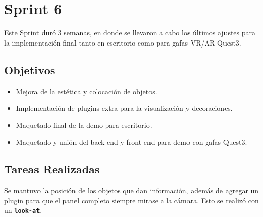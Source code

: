 \documentclass[a4paper, 12pt]{book}
\begin{document}
\clearpage
\section{Sprint 6} 
\label{sec:sprint6}
Este Sprint duró 3 semanas, en donde se llevaron a cabo los últimos ajustes para la implementación final tanto en escritorio como para gafas VR/AR Quest3.
\subsection{Objetivos}
\begin{itemize}
 \item Mejora de la estética y colocación de objetos.
 \item Implementación de plugins extra para la visualización y decoraciones.
 \item Maquetado final de la demo para escritorio.
 \item Maquetado y unión del back-end y front-end para demo con gafas Quest3. 
\end{itemize}
\subsection{Tareas Realizadas}
Se mantuvo la posición de los objetos que dan información, además de agregar un plugin para que el panel completo siempre mirase a la cámara. Esto se realizó con un \texttt{\textbf{look-at}}.
\end{document}
